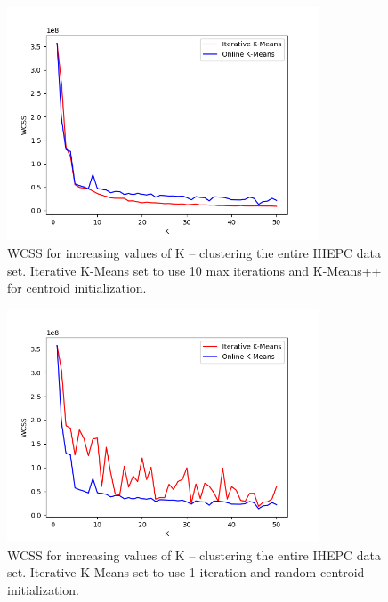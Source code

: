 \documentclass{l4proj}
\begin{document}
\begin{appendices}
\begin{figure}[H]
	\centering
    \includegraphics[width=0.825\textwidth]{images/result6}
    \caption{WCSS for increasing values of K -- clustering the entire IHEPC data set. Iterative K-Means set to use 10 max iterations and K-Means++ for centroid initialization. } 
    \label{fig:res6}
\end{figure}

\begin{figure}[H]
	\centering
    \includegraphics[width=0.825\textwidth]{images/result7}
    \caption{WCSS for increasing values of K -- clustering the entire IHEPC data set. Iterative K-Means set to use 1 iteration and random centroid initialization. }
    \label{fig:res7}
\end{figure}


\end{appendices}
\end{document}
